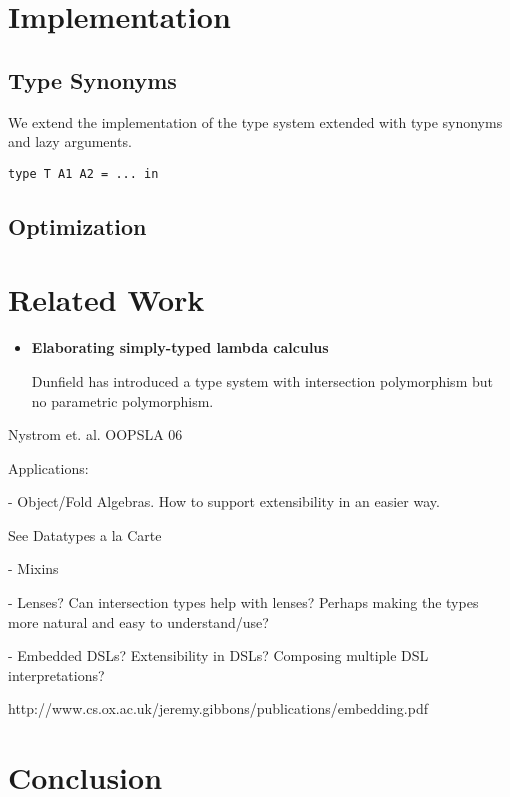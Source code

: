 \documentclass[preprint]{sigplanconf}
\begin{document}




\section{Implementation}

\subsection{Type Synonyms}

We extend the implementation of the type system extended with type synonyms and
lazy arguments.

\begin{lstlisting}
type T A1 A2 = ... in
\end{lstlisting}

\subsection{Optimization}
\section{Related Work}

\begin{itemize}

\item{\bf Elaborating simply-typed lambda calculus}

  Dunfield has introduced a type system with intersection polymorphism but no
  parametric polymorphism.

\end{itemize}

Nystrom et. al. OOPSLA 06

Applications:

- Object/Fold Algebras. How to support extensibility in an easier way.

See Datatypes a la Carte

- Mixins

- Lenses? Can intersection types help with lenses? Perhaps making the
types more natural and easy to understand/use?

- Embedded DSLs? Extensibility in DSLs? Composing multiple DSL interpretations?

http://www.cs.ox.ac.uk/jeremy.gibbons/publications/embedding.pdf

\section{Conclusion}
\end{document}
